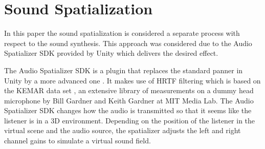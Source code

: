 \section{Sound Spatialization}

In this paper the sound spatialization is considered a separate process with respect to the sound synthesis. This approach was considered due to the Audio Spatializer \gls{SDK} provided by Unity\textsuperscript{\textregistered} which delivers the desired effect.

The Audio Spatializer \gls{SDK} is a plugin that replaces the standard panner in Unity\textsuperscript{\textregistered} by a more advanced one \cite{bib:unity_doc}. It makes use of \gls{HRTF} filtering which is based on the KEMAR data set \cite{bib:kemar}, an extensive library of  measurements on a dummy head microphone by Bill Gardner and Keith Gardner at MIT Media Lab. The Audio Spatializer \gls{SDK} changes how the audio is transmitted so that it seems like the listener is in a 3D environment. Depending on the position of the listener in the virtual scene and the audio source, the spatializer adjusts the left and right channel gains to simulate a virtual sound field.


